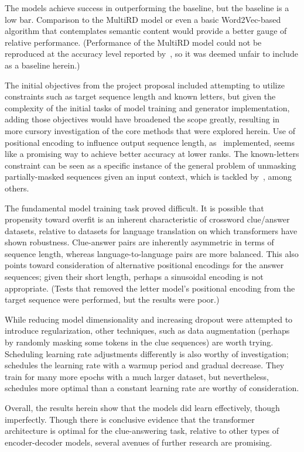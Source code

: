 \documentclass[letterpaper]{article} %
\begin{document}
\begin{NoHyper}
The models achieve success in outperforming the baseline, but the baseline is a low bar.
Comparison to the MultiRD model or even a basic Word2Vec-based algorithm that contemplates semantic content would provide a better gauge of relative performance.
(Performance of the MultiRD model could not be reproduced at the accuracy level reported by~\citealp{zhang2019multichannel}, so it was deemed unfair to include as a baseline herein.)

The initial objectives from the project proposal included attempting to utilize constraints such as target sequence length and known letters, but given the complexity of the initial tasks of model training and generator implementation, adding those objectives would have broadened the scope greatly, resulting in more cursory investigation of the core methods that were explored herein.
Use of positional encoding to influence output sequence length, as~\citealp{takase2019positional} implemented, seems like a promising way to achieve better accuracy at lower ranks.
The known-letters constraint can be seen as a specific instance of the general problem of unmasking partially-masked
sequences given an input context, which is tackled by~\citealp{raffel2023exploring}, among others.

The fundamental model training task proved difficult.
It is possible that propensity toward overfit is an inherent characteristic of crossword clue/answer datasets, relative to datasets for language translation on which transformers have shown robustness.
Clue-answer pairs are inherently asymmetric in terms of sequence length, whereas language-to-language pairs are more balanced.
This also points toward consideration of alternative positional encodings for the answer sequences; given their short length, perhaps a sinusoidal encoding is not appropriate.
(Tests that removed the letter model's positional encoding from the target sequence were performed, but the results were poor.)

While reducing model dimensionality and increasing dropout were attempted to introduce regularization, other techniques, such as data augmentation (perhaps by randomly masking some tokens in the clue sequences) are worth trying.
Scheduling learning rate adjustments differently is also worthy of investigation; \citealp{vaswani2017} schedules the learning rate with a warmup period and gradual decrease.
They train for many more epochs with a much larger dataset, but nevertheless, schedules more optimal than a constant learning rate are worthy of consideration.

Overall, the results herein show that the models did learn effectively, though imperfectly.
Though there is conclusive evidence that the transformer architecture is optimal for the clue-answering task, relative to other types of encoder-decoder models, several avenues of further research are promising.



\end{NoHyper}
\end{document}
